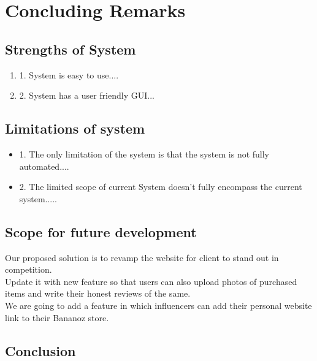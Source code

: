 \chapter{Concluding Remarks}


\section{Strengths of System}
\begin{enumerate}
\item 1.	System is easy to use....
\item 2.	System has a user friendly GUI...


\end{enumerate}

\section{Limitations of system}

\begin{itemize}
\item 1.	The only limitation of the system is that the system is not fully automated....
\item 2.	The limited scope of current System doesn’t fully encompass the current system.....


\end{itemize}

\section{Scope for future development} 

Our proposed solution is to revamp the website for client to stand out in competition.\\
Update it with new feature so that users can also upload photos of purchased items and write their honest reviews of the same.\\
We are going to add a feature in which influencers can add their personal website link to their Bananoz store.\\




\section{Conclusion}

